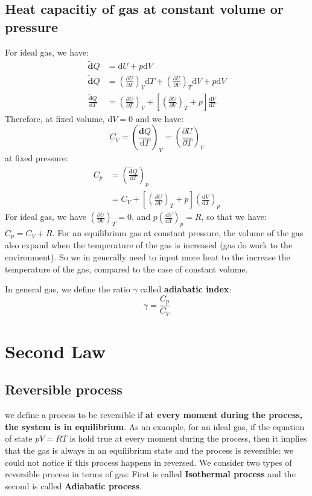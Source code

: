 \documentclass{article}
\newcommand{\pfrac}[2]{\frac{\partial #1}{\partial #2}}
\newcommand{\dbar}{\mathbf{\tilde{d}}}
\newcommand{\dnor}{\text{d}}
\begin{document}
\subsection{Heat capacitiy of gas at constant volume or pressure}
For ideal gas, we have:
\begin{align}
    \dbar Q &= \dnor U + p \dnor V \\
    \dbar Q & = \left(\pfrac{U}{T}\right)_V \dnor T + \left(\pfrac{U}{V}\right)_T \dnor V + p \dnor V \\
    \frac{\dbar Q}{\dnor T} &= \left(\pfrac{U}{T}\right)_V + \left[ \left(\pfrac{U}{V}\right)_T  + p \right] \frac{\dnor V}{\dnor T}
\end{align}
Therefore, at fixed volume, $\dnor V = 0$ and we have:
\begin{equation}
    C_V = \left(\frac{\dbar Q}{\dnor T}\right)_V = \left(\pfrac{U}{T}\right)_V
\end{equation}
at fixed pressure:
\begin{align}
    C_p & = \left(\frac{\dbar Q}{\dnor T}\right)_p \\
        & = C_V + \left[ \left(\pfrac{U}{V}\right)_T  + p \right] \left(\frac{\dnor V}{\dnor T}\right)_p
\end{align}
For ideal gas, we have $\left(\pfrac{U}{V}\right)_T = 0$. and $p \left(\frac{\dnor V}{\dnor T}\right)_p = R$,
so that we have: $C_p = C_V + R$. For an equilibrium gas at constant pressure, the volume of the gas also expand when
the temperature of the gas is increased (gas do work to the environment). 
So we in generally need to input more heat to the increase the temperature of the gas, compared to the case of constant 
volume. 

In general gas, we define the ratio $\gamma$ called \textbf{adiabatic index}:
\begin{equation}
    \gamma = \frac{C_p}{C_V}
\end{equation}


\section{Second Law}

\subsection{Reversible process}
we define a process to be reversible if \textbf{at every moment during the process, the system
is in equilibrium}. As an example, for an ideal gas, if the equation of state $pV = RT$ is hold true
at every moment during the process, then it implies that the gas is always in an equilibrium state
and the process is reversible: we could not notice if this process happens in reversed. 
We consider two types of reversible process in terms of gas: First is called \textbf{Isothermal process}
and the second is called \textbf{Adiabatic process}.
\end{document}
